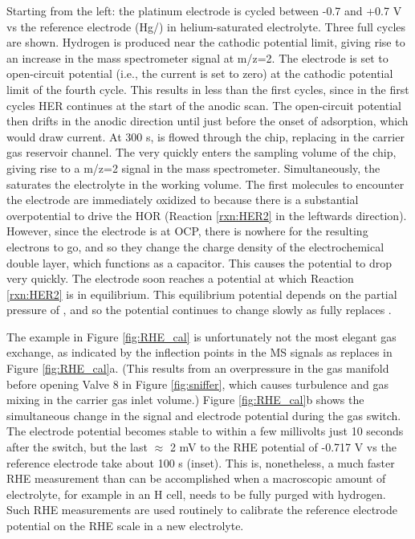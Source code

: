 Starting from the left: the platinum electrode is cycled between -0.7 and +0.7 V vs the reference electrode (Hg/) in helium-saturated electrolyte. Three full cycles are shown. Hydrogen is produced near the cathodic potential limit, giving rise to an increase in the mass spectrometer signal at m/z=2. The electrode is set to open-circuit potential (i.e., the current is set to zero) at the cathodic potential limit of the fourth cycle. This results in less  than the first cycles, since in the first cycles HER continues at the start of the anodic scan. The open-circuit potential then drifts in the anodic direction until just before the onset of  adsorption, which would draw current. At 300 s,  is flowed through the chip, replacing  in the carrier gas reservoir channel. The  very quickly enters the sampling volume of the chip, giving rise to a m/z=2 signal in the mass spectrometer. Simultaneously, the  saturates the electrolyte in the working volume. The first  molecules to encounter the electrode are immediately oxidized to  because there is a substantial overpotential to drive the HOR (Reaction \ref{rxn:HER2} in the leftwards direction). However, since the electrode is at OCP, there is nowhere for the resulting electrons to go, and so they change the charge density of the electrochemical double layer, which functions as a capacitor\cite{Chan2015a}. This causes the potential to drop very quickly. The electrode soon reaches a potential at which Reaction \ref{rxn:HER2} is in equilibrium. This equilibrium potential depends on the partial pressure of , and so the potential continues to change slowly as  fully replaces . 

The example in Figure \ref{fig:RHE_cal} is unfortunately not the most elegant gas exchange, as indicated by the inflection points in the MS signals as  replaces  in Figure \ref{fig:RHE_cal}a. (This results from an overpressure in the gas manifold before opening Valve 8 in Figure \ref{fig:sniffer}, which causes turbulence and gas mixing in the carrier gas inlet volume.) Figure \ref{fig:RHE_cal}b shows the simultaneous change in the  signal and electrode potential during the gas switch. The electrode potential becomes stable to within a few millivolts just 10 seconds after the switch, but the last $\approx$ 2 mV to the RHE potential of -0.717 V vs the reference electrode take about 100 s (inset). This is, nonetheless, a much faster RHE measurement than can be accomplished when a macroscopic amount of electrolyte, for example in an H cell, needs to be fully purged with hydrogen. Such RHE measurements are used routinely to calibrate the reference electrode potential on the RHE scale in a new electrolyte.

